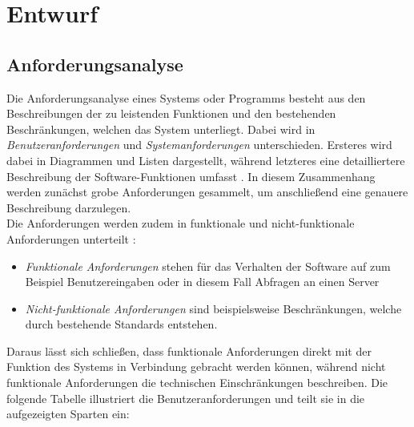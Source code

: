 \chapter{Entwurf} \label{chp:design}

\section{Anforderungsanalyse} \label{sec:requirements} Die Anforderungsanalyse 
eines Systems oder Programms besteht aus den Beschreibungen der zu leistenden Funktionen und 
den bestehenden Beschränkungen, welchen das System unterliegt.
Dabei wird in \textit{Benutzeranforderungen} und \textit{Systemanforderungen} unterschieden. 
Ersteres wird dabei in Diagrammen und Listen dargestellt, während letzteres eine detailliertere Beschreibung der Software-Funktionen umfasst \cite{Sommerville.2016}. In diesem Zusammenhang werden zunächst grobe Anforderungen gesammelt, um anschließend eine genauere Beschreibung darzulegen. \\
Die Anforderungen werden zudem in funktionale und nicht-funktionale Anforderungen unterteilt \cite{Sommerville.2016}:
\begin{itemize}
    \item \textit{Funktionale Anforderungen} stehen für das Verhalten der Software auf zum Beispiel Benutzereingaben oder in diesem Fall Abfragen an einen Server 
    \item \textit{Nicht-funktionale Anforderungen} sind beispielsweise Beschränkungen, welche durch bestehende Standards entstehen. 
\end{itemize}
Daraus lässt sich schließen, dass funktionale Anforderungen direkt mit der Funktion des Systems in Verbindung gebracht werden können, während nicht funktionale Anforderungen die technischen Einschränkungen beschreiben. Die folgende Tabelle illustriert die Benutzeranforderungen und teilt sie in die aufgezeigten Sparten ein:

